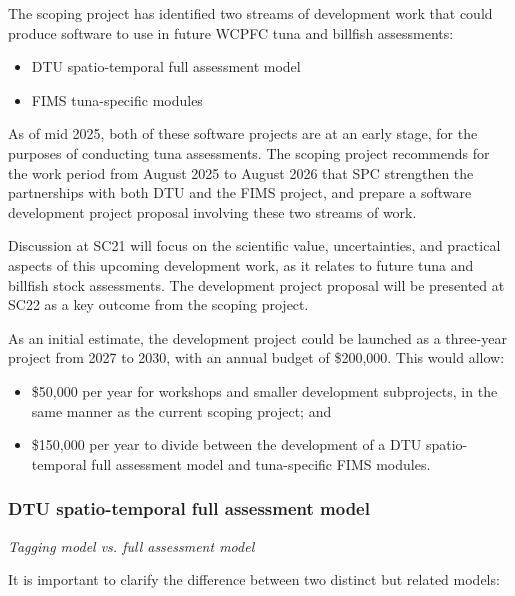 \documentclass{SCreport}
\begin{document}
\vspace{2ex}

The scoping project has identified two streams of development work that could
produce software to use in future WCPFC tuna and billfish assessments:

\begin{itemize}
  \item DTU spatio-temporal full assessment model\\[-4.5ex]
  \item FIMS tuna-specific modules
\end{itemize}

As of mid 2025, both of these software projects are at an early stage, for the
purposes of conducting tuna assessments. The scoping project recommends for the
work period from August 2025 to August 2026 that SPC strengthen the partnerships
with both DTU and the FIMS project, and prepare a software development project
proposal involving these two streams of work.

Discussion at SC21 will focus on the scientific value, uncertainties, and
practical aspects of this upcoming development work, as it relates to future
tuna and billfish stock assessments. The development project proposal will be
presented at SC22 as a key outcome from the scoping project.

As an initial estimate, the development project could be launched as a
three-year project from 2027 to 2030, with an annual budget of \$200,000. This
would allow:

\begin{itemize}
  \item \$50,000 per year for workshops and smaller development subprojects, in
  the same manner as the current scoping project; and
  \item \$150,000 per year to divide between the development of a DTU
  spatio-temporal full assessment model and tuna-specific FIMS modules.
\end{itemize}

\subsubsection{DTU spatio-temporal full assessment model}
\label{sec:dtu-development-project}

\vspace{1ex}

\textit{Tagging model vs. full assessment model}

It is important to clarify the difference between two distinct but related
models:
\end{document}
